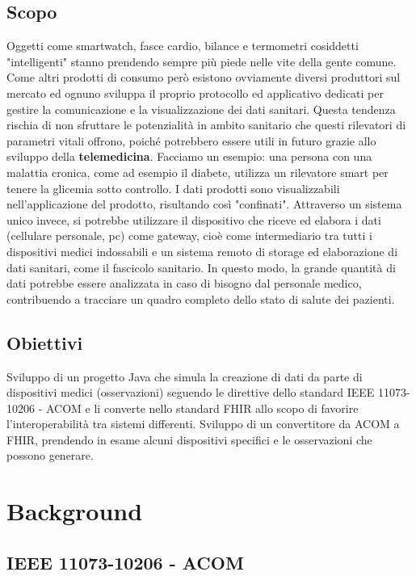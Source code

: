 \documentclass[a4paper]{article}
\begin{document}
\subsection{Scopo}
Oggetti come smartwatch, fasce cardio, bilance e termometri cosiddetti "intelligenti" stanno prendendo sempre più piede nelle vite della gente comune.
Come altri prodotti di consumo però esistono ovviamente diversi produttori sul mercato ed ognuno sviluppa il proprio protocollo ed applicativo dedicati
per gestire la comunicazione e la visualizzazione dei dati sanitari.
Questa tendenza rischia di non sfruttare le potenzialità in ambito sanitario che questi rilevatori di parametri vitali offrono, poiché potrebbero essere
utili in futuro grazie allo sviluppo della \textbf{telemedicina}.
Facciamo un esempio: una persona con una malattia cronica, come ad esempio il diabete, utilizza un rilevatore smart per tenere la glicemia sotto controllo.
I dati prodotti sono visualizzabili nell'applicazione del prodotto, risultando così "confinati".
Attraverso un sistema unico invece, si potrebbe utilizzare il dispositivo che riceve ed elabora i dati (cellulare personale, pc) come gateway, cioè come intermediario tra tutti i dispositivi
medici indossabili e un sistema remoto di storage ed elaborazione di dati sanitari, come il fascicolo sanitario.
In questo modo, la grande quantità di dati potrebbe essere analizzata in caso di bisogno dal personale medico, contribuendo a tracciare un quadro completo dello stato di salute dei pazienti.
\subsection{Obiettivi}
Sviluppo di un progetto Java che simula la creazione di dati da parte di dispositivi medici (osservazioni) seguendo le direttive dello standard IEEE 11073-10206 - ACOM e li converte nello
standard FHIR allo scopo di favorire l'interoperabilità tra sistemi differenti.
Sviluppo di un convertitore da ACOM a FHIR, prendendo in esame alcuni dispositivi specifici e le osservazioni che possono generare. 
\section{Background}
\subsection{IEEE 11073-10206 - ACOM}
\end{document}
